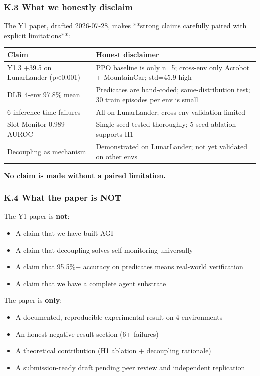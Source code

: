 \documentclass[11pt]{article}
\begin{document}
\subsubsection{K.3 What we honestly disclaim}

The Y1 paper, drafted 2026-07-28, makes **strong claims carefully paired
with explicit limitations**:

\begin{tabular}{ll}
Claim & Honest disclaimer \\
\hline
Y1.3 +39.5 on LunarLander (p<0.001) & PPO baseline is only n=5; cross-env only Acrobot + MountainCar; std=45.9 high \\
DLR 4-env 97.8\% mean & Predicates are hand-coded; same-distribution test; 30 train episodes per env is small \\
6 inference-time failures & All on LunarLander; cross-env validation limited \\
Slot-Monitor 0.989 AUROC & Single seed tested thoroughly; 5-seed ablation supports H1 \\
Decoupling as mechanism & Demonstrated on LunarLander; not yet validated on other envs \\
\end{tabular}


\textbf{No claim is made without a paired limitation.}

\subsubsection{K.4 What the paper is NOT}

The Y1 paper is \textbf{not}:
\begin{itemize}
  \item A claim that we have built AGI
  \item A claim that decoupling solves self-monitoring universally
  \item A claim that 95.5\%+ accuracy on predicates means real-world verification
  \item A claim that we have a complete agent substrate
\end{itemize}


The paper is \textbf{only}:
\begin{itemize}
  \item A documented, reproducible experimental result on 4 environments
  \item An honest negative-result section (6+ failures)
  \item A theoretical contribution (H1 ablation + decoupling rationale)
  \item A submission-ready draft pending peer review and independent replication
\end{itemize}
\end{document}
